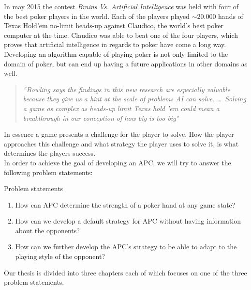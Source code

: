 In may 2015 the contest \textit{Brains Vs. Artificial Intelligence} \cite{brain-vs-ai} was held with four of the best poker players in the world. Each of the players played $\sim$20.000 hands of Texas Hold'em no-limit heads-up against Claudico, the world's best poker computer at the time. Claudico was able to beat one of the four players, which proves that artificial intelligence in regards to poker have come a long way.\\

Developing an algorithm capable of playing poker is not only limited to the domain of poker, but can end up having a future applications in other domains as well.

\begin{quotation}
\textit{``Bowling says the findings in this new research are especially valuable because they give us a hint at the scale of problems AI can solve. \ldots ~Solving a game as complex as heads-up limit Texas hold ’em could mean a breakthrough in our conception of how big is too big"} \cite{quote}
\end{quotation}

In essence a game presents a challenge for the player to solve. How the player approaches this challenge and what strategy the player uses to solve it, is what determines the players success.\\

In order to achieve the goal of developing an APC, we will try to answer the following problem statements:

\vspace{4mm}
\begin{statementBox2}{Problem statements}
\begin{enumerate}
    \item \label{itm:q1} How can APC determine the strength of a poker hand at any game state? \label{itm:ps1}
    \item \label{itm:q2} How can we develop a default strategy for APC without having information about the opponents? \label{itm:ps2}
    \item \label{itm:q3} How can we further develop the APC's strategy to be able to adapt to the playing style of the opponent? \label{itm:ps3}
  \end{enumerate}
\end{statementBox2}
\vspace{4mm}

Our thesis is divided into three chapters each of which focuses on one of the three problem statements.

